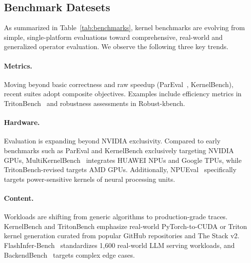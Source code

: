 \subsection{Benchmark Datesets}

As summarized in Table~\ref{tab:benchmarks}, kernel benchmarks are evolving from simple, single-platform evaluations toward comprehensive, real-world and generalized operator evaluation. We observe the following three key trends.

\paragraph{Metrics.} Moving beyond basic correctness and raw speedup (ParEval~\cite{pareval2024}, KernelBench), recent suites adopt composite objectives. Examples include efficiency metrics in TritonBench~\cite{Li_2025_TritonBench} and robustness assessments in Robust-kbench.

\paragraph{Hardware.} Evaluation is expanding beyond NVIDIA exclusivity. Compared to early benchmarks such as ParEval and KernelBench exclusively targeting NVIDIA GPUs, MultiKernelBench~\cite{wen2025multikernelbench} integrates HUAWEI NPUs and Google TPUs, while TritonBench-revised targets AMD GPUs. Additionally, NPUEval~\cite{kalade2025npueval} specifically targets power-sensitive kernels of neural processing units.

\paragraph{Content.} Workloads are shifting from generic algorithms to production-grade traces. KernelBench and TritonBench emphasize real-world PyTorch-to-CUDA or Triton kernel generation curated from popular GitHub repositories and The Stack v2. FlashInfer-Bench~\cite{xing2026flashinfer} standardizes 1,600 real-world LLM serving workloads, and BackendBench~\cite{saroufim2025backendbench} targets complex edge cases. 

